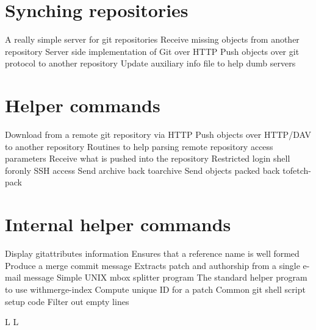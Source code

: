 \section{Synching repositories}
	{A really simple server for git repositories}
	{Receive missing objects from another repository}
	{Server side implementation of Git over HTTP}
	{Push objects over git protocol to another repository}
	{Update auxiliary info file to help dumb servers}

\section{Helper commands}
	{Download from a remote git repository via HTTP}
	{Push objects over HTTP/DAV to another repository}
	{Routines to help parsing remote repository access parameters}
	{Receive what is pushed into the repository}
	{Restricted login shell foronly SSH access}
	{Send archive back toarchive}
	{Send objects packed back tofetch-pack}

\section{Internal helper commands}
	{Display gitattributes information}
	{Ensures that a reference name is well formed}
	{Produce a merge commit message}
	{Extracts patch and authorship from a single e-mail message}
	{Simple UNIX mbox splitter program}
	{The standard helper program to use withmerge-index}
	{Compute unique ID for a patch}
	{Common git shell script setup code}
	{Filter out empty lines}

\copyrightnotice

\supereject
\if L\lr \else\null\vfill\eject\fi
\if L\lr \else\null\vfill\eject\fi
\bye

